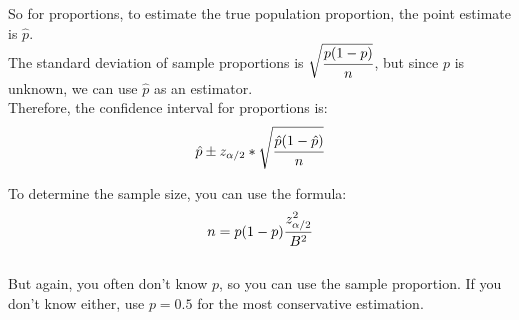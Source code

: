 \documentclass[12pt]{article}
\begin{document}
So for proportions, to estimate the true population proportion, the point estimate is $\hat{p}$. \\

The standard deviation of sample proportions is $\sqrt{\cfrac{p(1-p)}{n}}$, but since $p$ is unknown, we can use $\hat{p}$ as an estimator.\\

Therefore, the confidence interval for proportions is:\\
$$\hat{p} \pm z_{\alpha/2}*\sqrt{\cfrac{\hat{p}(1-\hat{p})}{n}}$$

To determine the sample size, you can use the formula:\\
$$n = p(1-p)\cfrac{z_{\alpha/2}^{2}}{B^{2}}$$\\

But again, you often don't know $p$, so you can use the sample proportion. If you don't know either, use $p=0.5$ for the most conservative estimation.\\
\end{document}
